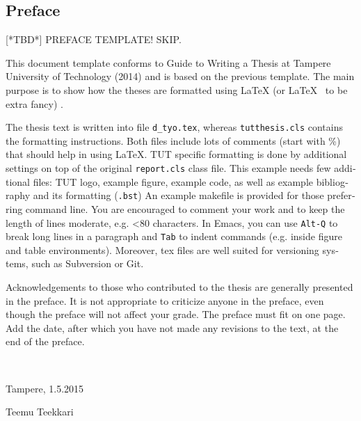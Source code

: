 \documentclass[12pt,a4paper,english]{tutthesis}
\begin{document}
\begin{otherlanguage}{english} %
\makeatother %

%
%
\chapter*{Preface}

[*TBD*]
PREFACE TEMPLATE! SKIP.

This document template conforms to Guide to Writing a Thesis at
Tampere University of Technology (2014) and is based on the previous
template. The main purpose is to show how the theses are formatted
using LaTeX (or \LaTeX ~ to be extra fancy) .


The thesis text is written into file \texttt{d\_tyo.tex}, whereas
\texttt{tutthesis.cls} contains the formatting instructions. Both
files include lots of comments (start with \%) that should help in
using LaTeX. TUT specific formatting is done by additional settings on
top of the original \texttt{report.cls} class file. This example needs
few additional files: TUT logo, example figure, example code, as well
as example bibliography and its formatting (\texttt{.bst}) An example
makefile is provided for those preferring command line. You are
encouraged to comment your work and to keep the length of lines
moderate, e.g. <80 characters. In Emacs, you can use \texttt{Alt-Q} to
break long lines in a paragraph and \texttt{Tab} to indent commands
(e.g. inside figure and table environments). Moreover, tex files are
well suited for versioning systems, such as Subversion or Git.  

Acknowledgements to those who contributed to the thesis are generally
presented in the preface. It is not appropriate to criticize anyone in
the preface, even though the preface will not affect your grade. The
preface must fit on one page. Add the date, after which you have not
made any revisions to the text, at the end of the preface.

~ 

Tampere, 1.5.2015
~


Teemu Teekkari
%
%

\renewcommand\contentsname{Table of Contents} %
\setcounter{tocdepth}{3}                      %


\end{otherlanguage}
\end{document}
